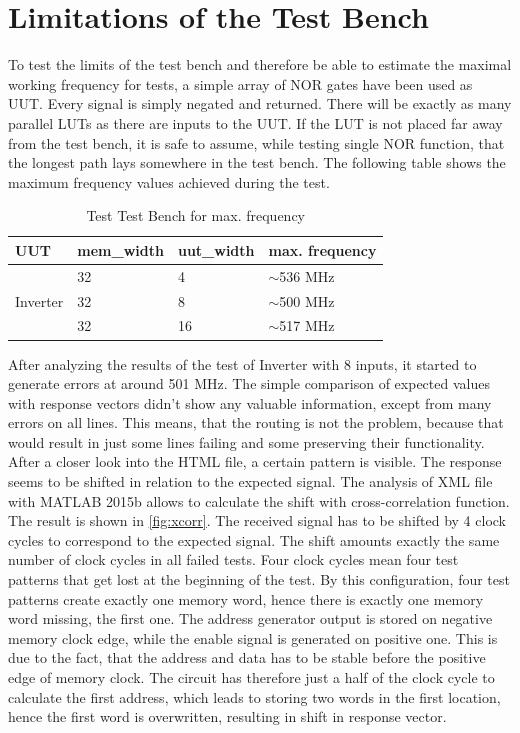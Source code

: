 \section{Limitations of the Test Bench}
To test the limits of the test bench and therefore be able to estimate the maximal working frequency for tests, a simple array of NOR gates have been used as UUT. Every signal is simply negated and returned. There will be exactly as many parallel LUTs as there are inputs to the UUT. If the LUT is not placed far away from the test bench, it is safe to assume, while testing single NOR function, that the longest path lays somewhere in the test bench. The following table shows the maximum frequency values achieved during the test.

\begin{table}[h]
\label{tab:max_freq}
\begin{tabular}{@{}llll@{}}
\toprule
UUT                       &mem\_width   &uut\_width &max. frequency \\ 
\midrule
\multirow{3}{*}{Inverter} &32           &4       & $\sim$536 MHz\\ 
                          & 32          & 8      & $\sim$500 MHz \\  
                          & 32          & 16     & $\sim$517 MHz \\ 
\bottomrule
\end{tabular}
\centering
\caption{Test Test Bench for max. frequency}
\end{table}

After analyzing the results of the test of Inverter with 8 inputs, it started to generate errors at around 501 MHz. The simple comparison of expected values with response vectors didn't show any valuable information, except from many errors on all lines. This means, that the routing is not the problem, because that would result in just some lines failing and some preserving their functionality. After a closer look into the HTML file, a certain pattern is visible. The response seems to be shifted in relation to the expected signal. The analysis of XML file with MATLAB 2015b allows to calculate the shift with cross-correlation function. The result is shown in \autoref{fig:xcorr}. The received signal has to be shifted by 4 clock cycles to correspond to the expected signal. The shift amounts exactly the same number of clock cycles in all failed tests. Four clock cycles mean four test patterns that get lost at the beginning of the test. By this configuration, four test patterns create exactly one memory word, hence there is exactly one memory word missing, the first one. The address generator output is stored on negative memory clock edge, while the enable signal is generated on positive one. This is due to the fact, that the address and data has to be stable before the positive edge of memory clock. The circuit has therefore just a half of the clock cycle to calculate the first address, which leads to storing two words in the first location, hence the first word is overwritten, resulting in shift in response vector.

